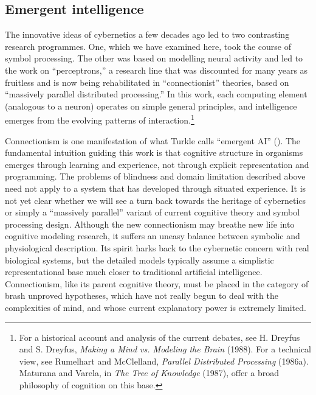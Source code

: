 \documentclass[12pt]{article}
\begin{document}
\subsection{Emergent intelligence}

The innovative ideas of cybernetics a few decades ago led to two contrasting research programmes. One, which we have examined here, took the course of symbol processing. The other was based on modelling neural activity and led to the work on ``perceptrons,'' a research line that was discounted for many years as fruitless and is now being rehabilitated in ``connectionist'' theories, based on ``massively parallel distributed processing.'' In this work, each computing element (analogous to a neuron) operates on simple general principles, and intelligence emerges from the evolving patterns of interaction.\footnote{For a historical account and analysis of the current debates, see H. Dreyfus and S. Dreyfus, {\it Making a Mind vs. Modeling the Brain} (1988). For a technical view, see Rumelhart and McClelland, {\it Parallel Distributed Processing} (1986a). Maturana and Varela, in {\it The Tree of Knowledge} (1987), offer a broad philosophy of cognition on this base.}

Connectionism is one manifestation of what Turkle calls ``emergent AI'' (\cite{turkle1987}). The fundamental intuition guiding this work is that cognitive structure in organisms emerges through learning and experience, not through explicit representation and programming. The problems of blindness and domain limitation described above need not apply to a system that has developed through situated experience.
It is not yet clear whether we will see a turn back towards the heritage of cybernetics or simply a ``massively parallel'' variant of current cognitive theory and symbol processing design. Although the new connectionism may breathe new life into cognitive modeling research, it suffers an uneasy balance between symbolic and physiological description. Its spirit harks back to the cybernetic concern with real biological systems, but the detailed models typically assume a simplistic representational base much closer to traditional artificial intelligence. Connectionism, like its parent cognitive theory, must be placed in the category of brash unproved hypotheses, which have not really begun to deal with the complexities of mind, and whose current explanatory power is extremely limited.
\end{document}
